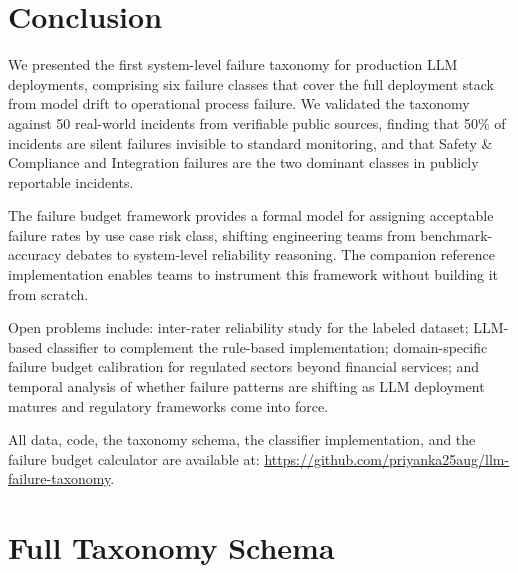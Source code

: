 \documentclass{article}
\begin{document}
\section{Conclusion}
\label{sec:conclusion}

We presented the first system-level failure taxonomy for production LLM
deployments, comprising six failure classes that cover the full deployment
stack from model drift to operational process failure.  We validated the
taxonomy against 50 real-world incidents from verifiable public sources,
finding that 50\% of incidents are silent failures invisible to standard
monitoring, and that Safety \& Compliance and Integration failures are the
two dominant classes in publicly reportable incidents.

The failure budget framework provides a formal model for assigning acceptable
failure rates by use case risk class, shifting engineering teams from
benchmark-accuracy debates to system-level reliability reasoning.  The
companion reference implementation enables teams to instrument this framework
without building it from scratch.

Open problems include: inter-rater reliability study for the labeled dataset;
LLM-based classifier to complement the rule-based implementation; domain-specific
failure budget calibration for regulated sectors beyond financial services;
and temporal analysis of whether failure patterns are shifting as LLM deployment
matures and regulatory frameworks come into force.

All data, code, the taxonomy schema, the classifier implementation, and the
failure budget calculator are available at:
\url{https://github.com/priyanka25aug/llm-failure-taxonomy}.




\appendix
\onecolumn

\section{Full Taxonomy Schema}
\label{appendix:schema}
\end{document}
